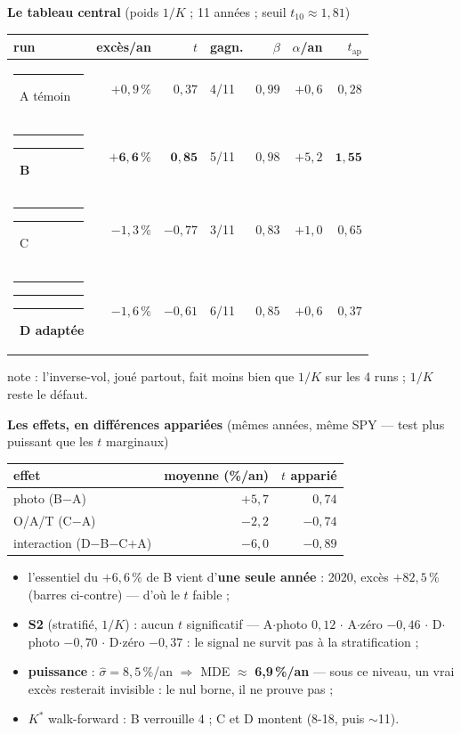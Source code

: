 \documentclass[10pt,a4paper,landscape]{article}
\newcommand{\chb}{{\color{bleu}\rule{2.1mm}{2.1mm}}}
\newcommand{\chv}{{\color{vert}\rule{2.1mm}{2.1mm}}}
\newcommand{\cho}{{\color{orange}\rule{2.1mm}{2.1mm}}}
\begin{document}
\noindent\begin{minipage}[t]{0.46\textwidth}\vspace{0pt}
\textbf{Le tableau central} {\scriptsize(poids $1/K$ ; 11 années ; seuil $t_{10} \approx 1{,}81$)}
\begin{center}\small
\begin{tabular}{@{}lrrlrrr@{}}
\toprule
run & excès/an & $t$ & gagn. & $\beta$ & $\alpha$/an & $t_{\text{ap}}$ \\
\midrule
\chb\ A témoin & $+0{,}9\,\%$ & $0{,}37$ & 4/11 & $0{,}99$ & $+0{,}6$ & $0{,}28$ \\
\chb\chv\ \textbf{B} & $\mathbf{+6{,}6\,\%}$ & $\mathbf{0{,}85}$ & 5/11 & $0{,}98$ & $+5{,}2$ & $\mathbf{1{,}55}$ \\
\chb\cho\ C & $-1{,}3\,\%$ & $-0{,}77$ & 3/11 & $0{,}83$ & $+1{,}0$ & $0{,}65$ \\
\chb\chv\cho\ \textbf{D adaptée} & $-1{,}6\,\%$ & $-0{,}61$ & 6/11 & $0{,}85$ & $+0{,}6$ & $0{,}37$ \\
\bottomrule
\end{tabular}
\end{center}
{\scriptsize note : l'inverse-vol, joué partout, fait moins bien que $1/K$ sur les 4 runs ; $1/K$ reste le défaut.}

\vspace{1.5mm}
\textbf{Les effets, en différences appariées} {\scriptsize(mêmes années, même SPY --- test plus puissant que les $t$ marginaux)}
\begin{center}\small
\begin{tabular}{@{}lrr@{}}
\toprule
effet & moyenne (\%/an) & $t$ apparié \\
\midrule
photo (B$-$A) & $+5{,}7$ & $0{,}74$ \\
O/A/T (C$-$A) & $-2{,}2$ & $-0{,}74$ \\
interaction (D$-$B$-$C$+$A) & $-6{,}0$ & $-0{,}89$ \\
\bottomrule
\end{tabular}
\end{center}
\begin{itemize}
\item[--] l'essentiel du $+6{,}6\,\%$ de B vient d'\textbf{une seule année} : 2020, excès $+82{,}5\,\%$ (barres ci-contre) --- d'où le $t$ faible ;
\item[--] \textbf{S2} (stratifié, $1/K$) : aucun $t$ significatif --- A$\cdot$photo $0{,}12$ $\cdot$ A$\cdot$zéro $-0{,}46$ $\cdot$ D$\cdot$photo $-0{,}70$ $\cdot$ D$\cdot$zéro $-0{,}37$ : le signal ne survit pas à la stratification ;
\item[--] \textbf{puissance} : $\hat\sigma = 8{,}5\,\%$/an $\Rightarrow$ MDE $\approx$ \textbf{6,9\,\%/an} --- sous ce niveau, un vrai excès resterait invisible : le nul borne, il ne prouve pas ;
\item[--] $K^*$ walk-forward : B verrouille $4$ ; C et D montent (8-18, puis $\sim$11).
\end{itemize}
\end{minipage}\hfill
\end{document}
